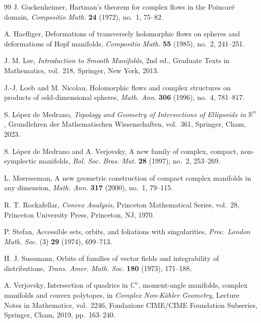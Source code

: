 \documentclass[11pt]{amsart}
\theoremstyle{definition}
\theoremstyle{remark}
\newcommand{\C}{\mathbb{C}}
\newcommand{\R}{\mathbb{R}}
\begin{document}
\begin{thebibliography}{99}
	J.
	Guckenheimer, Hartman's theorem for complex flows in the Poincaré domain, \emph{Compositio Math.
	} \textbf{24} (1972), no.~1, 75--82.

	A.
	Haefliger, Deformations of transversely holomorphic flows on spheres and deformations of Hopf manifolds, \emph{Compositio Math.
	} \textbf{55} (1985), no.~2, 241--251.

	J.
	M.
	Lee, \emph{Introduction to Smooth Manifolds}, 2nd ed., Graduate Texts in Mathematics, vol.~218, Springer, New York, 2013.

	J.-J.
	Loeb and M.
	Nicolau, Holomorphic flows and complex structures on products of odd-dimensional spheres, \emph{Math.
		Ann.
	} \textbf{306} (1996), no.~4, 781--817.


	S.
	López de Medrano, \emph{Topology and Geometry of Intersections of Ellipsoids in $\R^n$}, Grundlehren der Mathematischen Wissenschaften, vol.~361, Springer, Cham, 2023.

	S.
	López de Medrano and A.
	Verjovsky, A new family of complex, compact, non-symplectic manifolds, \emph{Bol.
		Soc.
		Bras.
		Mat.
	} \textbf{28} (1997), no.~2, 253--269.

	L.
	Meersseman, A new geometric construction of compact complex manifolds in any dimension, \emph{Math.
		Ann.
	} \textbf{317} (2000), no.~1, 79--115.

	R.
	T.
	Rockafellar, \emph{Convex Analysis}, Princeton Mathematical Series, vol.~28, Princeton University Press, Princeton, NJ, 1970.

	P.
	Stefan, Accessible sets, orbits, and foliations with singularities, \emph{Proc.
		London Math.
		Soc.
	} (3) \textbf{29} (1974), 699--713.

	H.
	J.
	Sussmann, Orbits of families of vector fields and integrability of distributions, \emph{Trans.
		Amer.
		Math.
		Soc.
	} \textbf{180} (1973), 171--188.


	A.
	Verjovsky, Intersection of quadrics in $\C^n$, moment-angle manifolds, complex manifolds and convex polytopes, in \emph{Complex Non-Kähler Geometry}, Lecture Notes in Mathematics, vol.~2246, Fondazione CIME/CIME Foundation Subseries, Springer, Cham, 2019, pp.~163--240.

\end{thebibliography}
\end{document}
